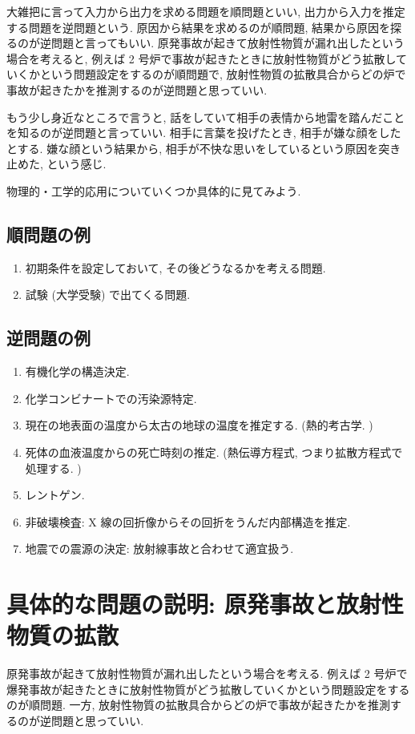\documentclass[openany, a4paper, oneside]{jsbook}
\begin{document}
大雑把に言って入力から出力を求める問題を順問題といい,
出力から入力を推定する問題を逆問題という.
原因から結果を求めるのが順問題, 結果から原因を探るのが逆問題と言ってもいい.
原発事故が起きて放射性物質が漏れ出したという場合を考えると,
例えば 2 号炉で事故が起きたときに放射性物質がどう拡散していくかという問題設定をするのが順問題で,
放射性物質の拡散具合からどの炉で事故が起きたかを推測するのが逆問題と思っていい.

もう少し身近なところで言うと, 話をしていて相手の表情から地雷を踏んだことを知るのが逆問題と言っていい.
相手に言葉を投げたとき, 相手が嫌な顔をしたとする.
嫌な顔という結果から, 相手が不快な思いをしているという原因を突き止めた, という感じ.

物理的・工学的応用についていくつか具体的に見てみよう.
\subsection{順問題の例}

\begin{enumerate}
\item 初期条件を設定しておいて, その後どうなるかを考える問題.
\item 試験 (大学受験) で出てくる問題.
\end{enumerate}
\subsection{逆問題の例}

\begin{enumerate}
\item 有機化学の構造決定.
\item 化学コンビナートでの汚染源特定.
\item 現在の地表面の温度から太古の地球の温度を推定する. (熱的考古学. )
\item 死体の血液温度からの死亡時刻の推定. (熱伝導方程式, つまり拡散方程式で処理する. )
\item レントゲン.
\item 非破壊検査: X 線の回折像からその回折をうんだ内部構造を推定.
\item 地震での震源の決定: 放射線事故と合わせて適宜扱う.
\end{enumerate}
\section{具体的な問題の説明: 原発事故と放射性物質の拡散}

原発事故が起きて放射性物質が漏れ出したという場合を考える.
例えば 2 号炉で爆発事故が起きたときに放射性物質がどう拡散していくかという問題設定をするのが順問題.
一方, 放射性物質の拡散具合からどの炉で事故が起きたかを推測するのが逆問題と思っていい.
\end{document}
